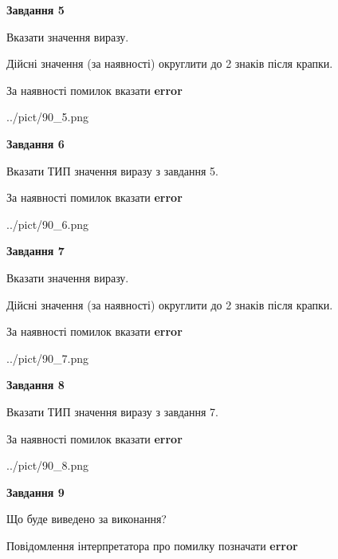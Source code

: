 \documentclass[11pt, ukrainian]{article}
\begin{document}
{\begin {large}
{\begin {center}\textbf{Завдання 5}\end {center}}\par
Вказати значення виразу. \par
Дійсні значення (за наявності) округлити до 2 знаків після крапки. \par
За наявності помилок вказати \textbf{error}

\begin{center}
	{../pict/90_5.png}
\end{center}
\newpage

{\begin {center}\textbf{Завдання 6}\end {center}}\par
Вказати ТИП значення виразу з завдання 5. \par
За наявності помилок вказати \textbf{error}

\begin{center}
	{../pict/90_6.png}
\end{center}
\newpage

{\begin {center}\textbf{Завдання 7}\end {center}}\par
Вказати значення виразу. \par
Дійсні значення (за наявності) округлити до 2 знаків після крапки. \par
За наявності помилок вказати \textbf{error}

\begin{center}
	{../pict/90_7.png}
\end{center}
\newpage

{\begin {center}\textbf{Завдання 8}\end {center}}\par
Вказати ТИП значення виразу з завдання 7. \par
За наявності помилок вказати \textbf{error}

\begin{center}
	{../pict/90_8.png}
\end{center}
\newpage

{\begin {center}\textbf{Завдання 9}\end {center}}\par
Що буде виведено за виконання? \par
Повідомлення інтерпретатора про помилку позначати \textbf{error}


\end{large}}
\end{document}
